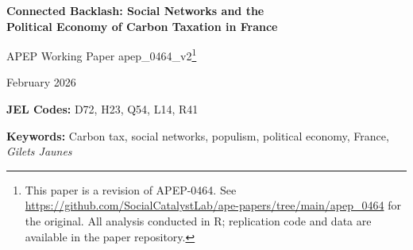 \documentclass[12pt]{article}
\newcommand{\rn}{Rassemblement National}
\newcommand{\depts}{d\'{e}partements}
\begin{document}

\begin{titlepage}
\begin{center}
\vspace*{1cm}

{\LARGE\bfseries Connected Backlash: Social Networks and the\\
Political Economy of Carbon Taxation in France}

\vspace{1cm}

{\large APEP Working Paper apep\_0464\_v2\footnote{This paper is a revision of APEP-0464. See \url{https://github.com/SocialCatalystLab/ape-papers/tree/main/apep_0464} for the original. All analysis conducted in R; replication code and data are available in the paper repository.}}

\vspace{0.5cm}

{\large February 2026}

\vspace{1cm}

\begin{abstract}
\noindent On November 17, 2018, 300,000 French citizens donned yellow vests to protest a carbon tax---but the protests spread far beyond where the tax hit hardest. This paper shows that social networks transmitted the backlash. Using Facebook's Social Connectedness Index to measure ties between French \depts{}, I construct commune-level network exposure to fuel-vulnerable communities. In a panel of 37,000 communes across ten elections (2002--2024), network exposure raises \rn{} vote share by 1.19 percentage points per standard deviation---67\% larger than a commune's own fuel costs. An event study with four pre-treatment coefficients confirms flat pre-trends. The effect is absent for Green and center-right parties, strongest in rural areas, and robust to distance restrictions isolating social from geographic proximity. A spatial autoregressive model estimates that a one-percentage-point localized shock propagates to a nationally-weighted 2.4-percentage-point effect through network amplification.
\end{abstract}

\vspace{0.3cm}

\textbf{JEL Codes:} D72, H23, Q54, L14, R41

\textbf{Keywords:} Carbon tax, social networks, populism, political economy, France, \textit{Gilets Jaunes}

\end{center}
\end{titlepage}
\end{document}
